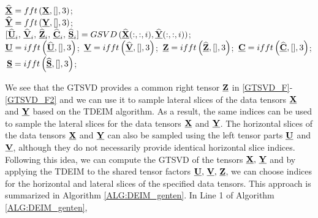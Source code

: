 \documentclass[preprint,12pt]{elsarticle}
\theoremstyle{definition}
\newcommand{\cX}{\underline{\bf X}}
\newcommand{\cY}{\underline{\bf Y}}
\newcommand{\cU}{\underline{\bf U}}
\newcommand{\cV}{\underline{\bf V}}
\newcommand{\cZ}{\underline{\bf Z}}
\newcommand{\X}{{\bf X}}
\newcommand{\Y}{{\bf Y}}
\begin{document}
\begin{algorithm}
\caption{Generalized t-SVD of $\underline{\bf X}$ and $\underline{\bf Y}$}\label{ALG:GTSVD}
      {
      $\widehat{\underline{\mathbf X}} = {\rm fft}\left( {\underline{\mathbf X},[],3} \right)$;\\
        $\widehat{\underline{\mathbf Y}} = {\rm fft}\left( {\underline{\mathbf Y},[],3} \right)$;\\
{                        
$[\widehat{\underline{\mathbf U}}_i,\,\widehat{\underline{\mathbf V}}_i,\,\widehat{\underline{\mathbf Z}}_i,\,\widehat{\underline{\mathbf C}}_i,\,\widehat{\underline{\mathbf S}}_i]= {\rm GSVD}\,(\widehat{\underline{\X}}(:,:,i),\widehat{\underline{\Y}}(:,:,i))$;\\
}
${\underline{\mathbf U}} = {\rm ifft}\left( {\widehat{\underline{\mathbf U}},[],3} \right)$;
$\,{\underline{\mathbf V}} = {\rm ifft}\left( {\widehat{\underline{\mathbf V}},[],3} \right)$; 
$\,{\underline{\mathbf Z}} = {\rm ifft}\left( {\widehat{\underline{\mathbf Z}},[],3} \right)$;
$\,{\underline{\mathbf C}} = {\rm ifft}\left( {\widehat{\underline{\mathbf C}},[],3} \right)$; 
$\,{\underline{\mathbf S}} = {\rm ifft}\left( {\widehat{\underline{\mathbf S}},[],3} \right)$; 
       	}       	
\end{algorithm}
We see that the GTSVD provides a common right tensor $\cZ$ in \eqref{GTSVD_F}-\eqref{GTSVD_F2} and we can use it to sample lateral slices of the data tensors $\cX$ and $\cY$ based on the TDEIM algorithm. As a result, the same indices can be used to sample the lateral slices for the data tensors $\cX$ and $\cY$. The horizontal slices of the data tensors $\cX$ and $\cY$ can also be sampled using the left tensor parts $\cU$ and $\cV$, although they do not necessarily provide identical horizontal slice indices. Following this idea, we can compute the GTSVD of the tensors $\cX,\,\cY$ and by applying the TDEIM to the shared tensor factors $\cU,\,\cV,\,\cZ$, we can choose indices for the horizontal and lateral slices of the specified data tensors. This approach is summarized in Algorithm \ref{ALG:DEIM_genten}. In Line 1 of Algorithm \ref{ALG:DEIM_genten}, 
\end{document}
